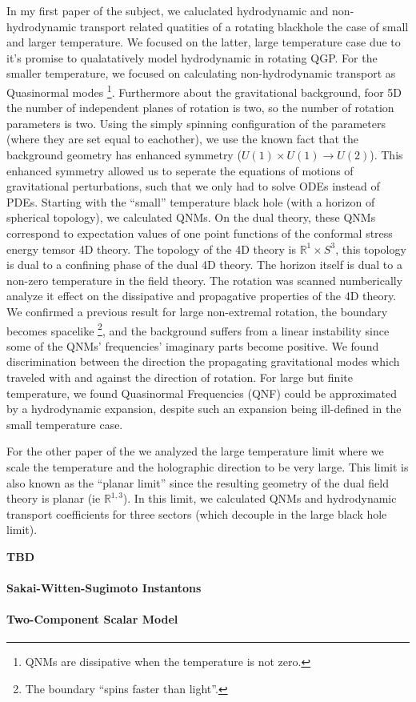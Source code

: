 \documentclass[fontsize=12pt]{article}
\begin{document}
In my first paper of the subject, we caluclated hydrodynamic and non-hydrodynamic transport related quatities of a rotating blackhole the case of small and larger temperature.
We focused on the latter, large temperature case due to it's promise to qualatatively model hydrodynamic in rotating QGP.
For the smaller temperature, we focused on calculating non-hydrodynamic transport as Quasinormal modes
  \footnote{QNMs are dissipative when the temperature is not zero.}.
Furthermore about the gravitational background, foor 5D the number of independent planes of rotation is two, so the number of rotation parameters is two.
Using the simply spinning configuration of the parameters (where they are set equal to eachother), we use the known fact that the background geometry has enhanced symmetry ($U(1)\times U(1) \rightarrow U(2)$).
This enhanced symmetry allowed us to seperate the equations of motions of gravitational perturbations, such that we only had to solve ODEs instead of PDEs.
Starting with the ``small'' temperature black hole (with a horizon of spherical topology), we calculated QNMs.
On the dual theory, these QNMs correspond to expectation values of one point functions of the conformal stress energy temsor 4D theory.
The topology of the 4D theory is $\mathds{R}^1 \times S^3$, this topology is dual to a confining phase of the dual 4D theory.
The horizon itself is dual to a non-zero temperature in the field theory.
The rotation was scanned numberically analyze it effect on the dissipative and propagative properties of the 4D theory.
We confirmed a previous result for large non-extremal rotation, the boundary becomes spacelike
  \footnote{The boundary ``spins faster than light''.}, 
and the background suffers from a linear instability since some of the QNMs' frequencies' imaginary parts become positive.
We found discrimination between the direction the propagating gravitational modes which traveled with and against the direction of rotation.
For large but finite temperature, we found Quasinormal Frequencies (QNF) could be approximated by a hydrodynamic expansion, despite such an expansion being ill-defined in the small temperature case.

For the other paper of the we analyzed the large temperature limit where we scale the temperature and the holographic direction to be very large.
This limit is also known as the ``planar limit'' since the resulting geometry of the dual field theory is planar (ie $\mathds{R}^{1,3}$).
In this limit, we calculated QNMs and hydrodynamic transport coefficients for three sectors (which decouple in the large black hole limit).

\bf{TBD}

\paragraph{Sakai-Witten-Sugimoto Instantons}


\paragraph{Two-Component Scalar Model}

\end{document}
